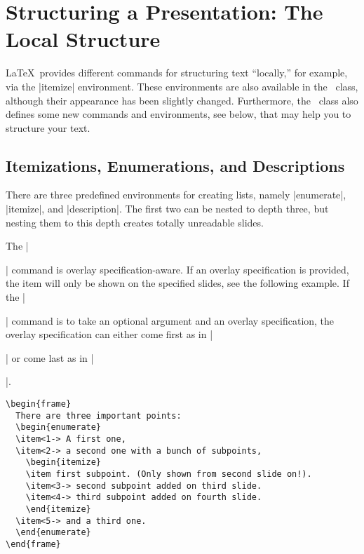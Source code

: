 %
%
%


\section{Structuring a Presentation: The Local Structure}

\LaTeX\ provides different commands for structuring text ``locally,'' for example, via the |itemize| environment. These environments are also available in the \beamer\ class, although their appearance has been slightly changed. Furthermore, the \beamer\ class also defines some new commands and environments, see below, that may help you to structure your text.


\subsection{Itemizations, Enumerations, and Descriptions}
\label{section-enumerate}

There are three predefined environments for creating lists, namely |enumerate|, |itemize|, and |description|. The first two can be nested to depth three, but nesting them to this depth creates totally unreadable slides.

The |\item| command is overlay specification-aware. If an overlay specification is provided, the item will only be shown on the specified slides, see the following example. If the |\item| command is to take an optional argument and an overlay specification, the overlay specification can either come first as in |\item<1>[Cat]| or come last as in |\item[Cat]<1>|.
\begin{verbatim}
\begin{frame}
  There are three important points:
  \begin{enumerate}
  \item<1-> A first one,
  \item<2-> a second one with a bunch of subpoints,
    \begin{itemize}
    \item first subpoint. (Only shown from second slide on!).
    \item<3-> second subpoint added on third slide.
    \item<4-> third subpoint added on fourth slide.
    \end{itemize}
  \item<5-> and a third one.
  \end{enumerate}
\end{frame}
\end{verbatim}

